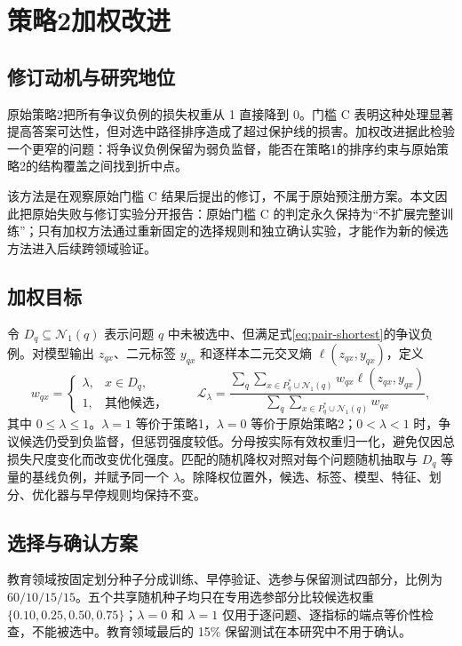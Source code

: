 \documentclass[UTF8,11pt]{ctexart}
\newcommand{\Norig}{\mathcal{N}_{1}}
\begin{document}
\section{策略2加权改进}

\subsection{修订动机与研究地位}

原始策略2把所有争议负例的损失权重从 1 直接降到 0。门槛 C 表明这种处理显著提高答案可达性，但对选中路径排序造成了超过保护线的损害。加权改进据此检验一个更窄的问题：将争议负例保留为弱负监督，能否在策略1的排序约束与原始策略2的结构覆盖之间找到折中点。

该方法是在观察原始门槛 C 结果后提出的修订，不属于原始预注册方案。本文因此把原始失败与修订实验分开报告：原始门槛 C 的判定永久保持为“不扩展完整训练”；只有加权方法通过重新固定的选择规则和独立确认实验，才能作为新的候选方法进入后续跨领域验证。

\subsection{加权目标}

令 $D_q\subseteq\Norig(q)$ 表示问题 $q$ 中未被选中、但满足式\eqref{eq:pair-shortest}的争议负例。对模型输出 $z_{qx}$、二元标签 $y_{qx}$ 和逐样本二元交叉熵 $\ell(z_{qx},y_{qx})$，定义
\begin{equation}
 w_{qx}=\begin{cases}
 \lambda, & x\in D_q,\\
 1, & \text{其他候选，}
 \end{cases}
 \qquad
 \mathcal L_{\lambda}=
 \frac{\sum_q\sum_{x\in P_q^*\cup\Norig(q)}
 w_{qx}\ell(z_{qx},y_{qx})}
 {\sum_q\sum_{x\in P_q^*\cup\Norig(q)}w_{qx}},
 \label{eq:weighted-loss}
\end{equation}
其中 $0\leq\lambda\leq1$。$\lambda=1$ 等价于策略1，$\lambda=0$ 等价于原始策略2；$0<\lambda<1$ 时，争议候选仍受到负监督，但惩罚强度较低。分母按实际有效权重归一化，避免仅因总损失尺度变化而改变优化强度。匹配的随机降权对照对每个问题随机抽取与 $D_q$ 等量的基线负例，并赋予同一个 $\lambda$。除降权位置外，候选、标签、模型、特征、划分、优化器与早停规则均保持不变。

\subsection{选择与确认方案}

教育领域按固定划分种子分成训练、早停验证、选参与保留测试四部分，比例为 $60/10/15/15$。五个共享随机种子均只在专用选参部分比较候选权重 $\{0.10,0.25,0.50,0.75\}$；$\lambda=0$ 和 $\lambda=1$ 仅用于逐问题、逐指标的端点等价性检查，不能被选中。教育领域最后的 15\% 保留测试在本研究中不用于确认。
\end{document}
